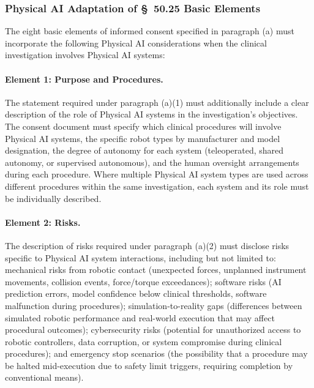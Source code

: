 \documentclass[11pt]{article}
\begin{document}
\subsubsection{Physical AI Adaptation of \S~50.25 Basic Elements}

The eight basic elements of informed consent specified in paragraph (a) must incorporate the following Physical AI considerations when the clinical investigation involves Physical AI systems:

\paragraph{Element 1: Purpose and Procedures.} The statement required under paragraph (a)(1) must additionally include a clear description of the role of Physical AI systems in the investigation's objectives. The consent document must specify which clinical procedures will involve Physical AI systems, the specific robot types by manufacturer and model designation, the degree of autonomy for each system (teleoperated, shared autonomy, or supervised autonomous), and the human oversight arrangements during each procedure. Where multiple Physical AI system types are used across different procedures within the same investigation, each system and its role must be individually described.

\paragraph{Element 2: Risks.} The description of risks required under paragraph (a)(2) must disclose risks specific to Physical AI system interactions, including but not limited to: mechanical risks from robotic contact (unexpected forces, unplanned instrument movements, collision events, force/torque exceedances); software risks (AI prediction errors, model confidence below clinical thresholds, software malfunction during procedures); simulation-to-reality gaps (differences between simulated robotic performance and real-world execution that may affect procedural outcomes); cybersecurity risks (potential for unauthorized access to robotic controllers, data corruption, or system compromise during clinical procedures); and emergency stop scenarios (the possibility that a procedure may be halted mid-execution due to safety limit triggers, requiring completion by conventional means).
\end{document}
